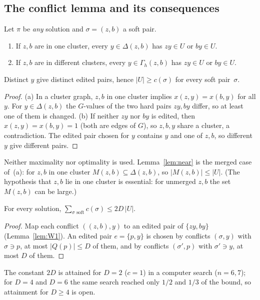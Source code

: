 \subsection{The conflict lemma and its consequences}
\begin{lemma}[W1: conflicts]\label{lem:W1}
Let $\pi$ be \emph{any} solution and $\sigma=(z,b)$ a soft pair.
\begin{enumerate}
\item[(a)] If $z,b$ are in one cluster, every $y\in\Delta(z,b)$ has $zy\in U$ or $by\in U$.
\item[(b)] If $z,b$ are in different clusters, every $y\in\Gamma_h(z,b)$ has $zy\in U$ or $by\in U$.
\end{enumerate}
Distinct $y$ give distinct edited pairs, hence $|U|\ge c(\sigma)$ for every soft pair~$\sigma$.
\end{lemma}
\begin{proof}
(a) In a cluster graph, $z,b$ in one cluster implies $x(z,y)=x(b,y)$ for all $y$. For $y\in\Delta(z,b)$ the $G$-values of the two hard pairs $zy,by$ differ, so at least one of them is changed. (b) If neither $zy$ nor $by$ is edited, then $x(z,y)=x(b,y)=1$ (both are edges of $G$), so $z,b,y$ share a cluster, a contradiction. The edited pair chosen for $y$ contains $y$ and one of $z,b$, so different $y$ give different pairs.
\end{proof}
Neither maximality nor optimality is used. Lemma~\ref{lem:near} is the merged case of~(a): for $z,b$ in one cluster $M(z,b)\subseteq\Delta(z,b)$, so $|M(z,b)|\le|U|$. (The hypothesis that $z,b$ lie in one cluster is essential: for unmerged $z,b$ the set $M(z,b)$ can be large.)

\begin{lemma}\label{lem:W2}
For every solution, $\sum_{\sigma\text{ soft}}c(\sigma)\le2D\,|U|$.
\end{lemma}
\begin{proof}
Map each conflict $((z,b),y)$ to an edited pair of $\{zy,by\}$ (Lemma~\ref{lem:W1}). An edited pair $e=\{p,y\}$ is chosen by conflicts $(\sigma,y)$ with $\sigma\ni p$, at most $|Q(p)|\le D$ of them, and by conflicts $(\sigma',p)$ with $\sigma'\ni y$, at most $D$ of them.
\end{proof}
The constant $2D$ is attained for $D=2$ ($c=1$) in a computer search ($n=6,7$); for $D=4$ and $D=6$ the same search reached only $1/2$ and $1/3$ of the bound, so attainment for $D\ge4$ is open.

